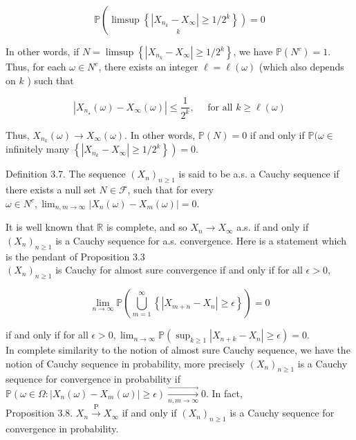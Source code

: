 \documentclass[11pt]{amsbook}
\theoremstyle{plain}%
\theoremstyle{definition}
\theoremstyle{remark}
\begin{document}
$$
\mathbb{P}\left(\underset{k}{\left.\limsup \left\{\left|X_{n_{k}}-X_{\infty}\right| \geq 1 / 2^{k}\right\}\right)}=0\right.
$$

In other words, if $N=\limsup \left\{\left|X_{n_{k}}-X_{\infty}\right| \geq 1 / 2^{k}\right\}$, we have $\mathbb{P}\left(N^{c}\right)=1$. Thus, for each $\omega \in N^{c}$, there exists an integer $\ell=\ell(\omega)$ (which also depends on $k$ ) such that

$$
\left|X_{n_{\star}}(\omega)-X_{\infty}(\omega)\right| \leq \frac{1}{2^{k}}, \quad \text { for all } k \geq \ell(\omega)
$$

Thus, $X_{n_{k}}(\omega) \rightarrow X_{\infty}(\omega)$. In other words, $\mathbb{P}(N)=0$ if and only if $\mathbb{P}(\omega \in$ infinitely many $\left.\left\{\left|X_{n_{k}}-X_{\infty}\right| \geq 1 / 2^{k}\right\}\right)=0$.

Definition 3.7. The sequence $\left(X_{n}\right)_{n \geq 1}$ is said to be a.s. a Cauchy sequence if there exists a null set $N \in \mathcal{F}$, such that for every $\omega \in N^{c}, \lim _{n, m \rightarrow \infty}\left|X_{n}(\omega)-X_{m}(\omega)\right|=0$.

It is well known that $\mathbb{R}$ is complete, and so $X_{n} \rightarrow X_{\infty}$ a.s. if and only if $\left(X_{n}\right)_{n \geq 1}$ is a Cauchy sequence for a.s. convergence. Here is a statement which is the pendant of Proposition 3.3\\
$\left(X_{n}\right)_{n \geq 1}$ is Cauchy for almost sure convergence if and only if for all $\epsilon>0$,

$$
\lim _{n \rightarrow \infty} \mathbb{P}\left(\bigcup_{m=1}^{\infty}\left\{\left|X_{m+n}-X_{n}\right| \geq \epsilon\right\}\right)=0
$$

if and only if for all $\epsilon>0, \lim _{n \rightarrow \infty} \mathbb{P}\left(\sup _{k \geq 1}\left|X_{n+k}-X_{n}\right| \geq \epsilon\right)=0$.\\
In complete similarity to the notion of almost sure Cauchy sequence, we have the notion of Cauchy sequence in probability, more precisely $\left(X_{n}\right)_{n \geq 1}$ is a Cauchy sequence for convergence in probability if $\mathbb{P}\left(\omega \in \Omega:\left|X_{n}(\omega)-X_{m}(\omega)\right| \geq \epsilon\right) \xrightarrow[n, m \rightarrow \infty]{\longrightarrow} 0$. In fact,\\
Proposition 3.8. $X_{n} \xrightarrow{\mathrm{P}} X_{\infty}$ if and only if $\left(X_{n}\right)_{n \geq 1}$ is a Cauchy sequence for convergence in probability.
\end{document}
